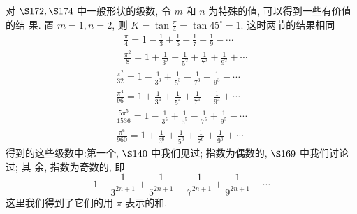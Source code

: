 对 $\S 172, \S 174$ 中一般形状的级数, 令 $m$ 和 $n$ 为特殊的值, 可以得到一些有价值的结 果. 置 $m=1, n=2$, 则 $K=\tan \frac{\pi}{4}=\tan 45^{\circ}=1$. 这时两节的结果相同
\[
\begin{aligned}
& \frac{\pi}{4}=1-\frac{1}{3}+\frac{1}{5}-\frac{1}{7}+\frac{1}{9}-\cdots \\
& \frac{\pi^{2}}{8}=1+\frac{1}{3^{2}}+\frac{1}{5^{2}}+\frac{1}{7^{2}}+\frac{1}{9^{2}}+\cdots
\end{aligned}
\]
\[
\begin{gathered}
\frac{\pi^{2}}{32}=1-\frac{1}{3^{3}}+\frac{1}{5^{3}}-\frac{1}{7^{3}}+\frac{1}{9^{3}}-\cdots \\
\frac{\pi^{4}}{96}=1+\frac{1}{3^{4}}+\frac{1}{5^{4}}+\frac{1}{7^{4}}+\frac{1}{9^{4}}+\cdots \\
\frac{5 \pi^{5}}{1536}=1-\frac{1}{3^{5}}+\frac{1}{5^{5}}-\frac{1}{7^{5}}+\frac{1}{9^{5}}-\cdots \\
\frac{\pi^{6}}{960}=1+\frac{1}{3^{6}}+\frac{1}{5^{6}}+\frac{1}{7^{6}}+\frac{1}{9^{6}}+\cdots
\end{gathered}
\]
得到的这些级数中:第一个, $\S 140$ 中我们见过; 指数为偶数的, $\S 169$ 中我们讨论过; 其 余, 指数为奇数的, 即
\[
1-\frac{1}{3^{2 n+1}}+\frac{1}{5^{2 n+1}}-\frac{1}{7^{2 n+1}}+\frac{1}{9^{2 n+1}}-\cdots
\]
这里我们得到了它们的用 $\pi$ 表示的和.

